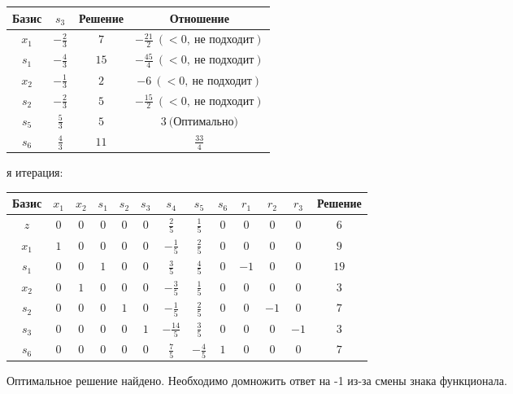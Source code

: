 \documentclass{article}%
\begin{document}
\begin{flushleft}
\begin{tabular}{|cccc|}%
\hline%
Базис&$s_{3}$&Решение&Отношение\\%
\hline%
$x_{1}$&$-\frac{2}{3}$&$7$&$-\frac{21}{2}\: (< 0, \: \text{не подходит})$\\%
$s_{1}$&$-\frac{4}{3}$&$15$&$-\frac{45}{4}\: (< 0, \: \text{не подходит})$\\%
$x_{2}$&$-\frac{1}{3}$&$2$&$-6\: (< 0, \: \text{не подходит})$\\%
$s_{2}$&$-\frac{2}{3}$&$5$&$-\frac{15}{2}\: (< 0, \: \text{не подходит})$\\%
$s_{5}$&$\frac{5}{3}$&$5$&$3\: \text{(Оптимально)}$\\%
$s_{6}$&$\frac{4}{3}$&$11$&$\frac{33}{4}$\\%
\hline%
\end{tabular}%
\newline%
\newline%
я итерация: %
\newline%
\newline%
\renewcommand{\arraystretch}{1.3}%
\begin{tabular}{|c|ccccccccccc|c|}%
\hline%
Базис&$x_{1}$&$x_{2}$&$s_{1}$&$s_{2}$&$s_{3}$&$s_{4}$&$s_{5}$&$s_{6}$&$r_{1}$&$r_{2}$&$r_{3}$&Решение\\%
\hline%
$z$&$0$&$0$&$0$&$0$&$0$&$\frac{2}{5}$&$\frac{1}{5}$&$0$&$0$&$0$&$0$&$6$\\%
\hline%
$x_{1}$&$1$&$0$&$0$&$0$&$0$&$-\frac{1}{5}$&$\frac{2}{5}$&$0$&$0$&$0$&$0$&$9$\\%
$s_{1}$&$0$&$0$&$1$&$0$&$0$&$\frac{3}{5}$&$\frac{4}{5}$&$0$&$-1$&$0$&$0$&$19$\\%
$x_{2}$&$0$&$1$&$0$&$0$&$0$&$-\frac{3}{5}$&$\frac{1}{5}$&$0$&$0$&$0$&$0$&$3$\\%
$s_{2}$&$0$&$0$&$0$&$1$&$0$&$-\frac{1}{5}$&$\frac{2}{5}$&$0$&$0$&$-1$&$0$&$7$\\%
$s_{3}$&$0$&$0$&$0$&$0$&$1$&$-\frac{14}{5}$&$\frac{3}{5}$&$0$&$0$&$0$&$-1$&$3$\\%
$s_{6}$&$0$&$0$&$0$&$0$&$0$&$\frac{7}{5}$&$-\frac{4}{5}$&$1$&$0$&$0$&$0$&$7$\\%
\hline%
\end{tabular}%
\newline%
\end{flushleft}%
Оптимальное решение найдено. Необходимо домножить ответ на {-}1 из{-}за смены знака функционала.%
\newline%
\end{document}
